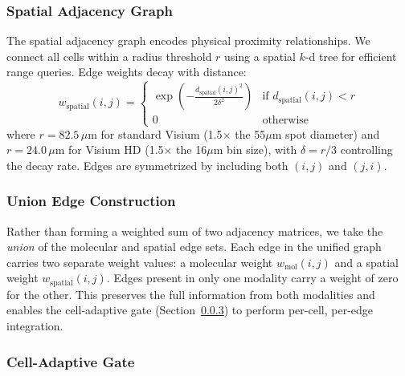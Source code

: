 \documentclass{article}
\begin{document}
\subsubsection{Spatial Adjacency Graph}

The spatial adjacency graph encodes physical proximity relationships. We connect all cells within a radius threshold $r$ using a spatial $k$-d tree for efficient range queries. Edge weights decay with distance:
\begin{equation}
w_{\text{spatial}}(i,j) = \begin{cases}
\exp\left(-\frac{d_{\text{spatial}}(i,j)^2}{2\delta^2}\right) & \text{if } d_{\text{spatial}}(i,j) < r \\
0 & \text{otherwise}
\end{cases}
\end{equation}
where $r = 82.5\,\mu$m for standard Visium (1.5$\times$ the 55$\mu$m spot diameter) and $r = 24.0\,\mu$m for Visium HD (1.5$\times$ the 16$\mu$m bin size), with $\delta = r/3$ controlling the decay rate. Edges are symmetrized by including both $(i,j)$ and $(j,i)$.

\subsubsection{Union Edge Construction}

Rather than forming a weighted sum of two adjacency matrices, we take the \emph{union} of the molecular and spatial edge sets. Each edge in the unified graph carries two separate weight values: a molecular weight $w_{\text{mol}}(i,j)$ and a spatial weight $w_{\text{spatial}}(i,j)$. Edges present in only one modality carry a weight of zero for the other. This preserves the full information from both modalities and enables the cell-adaptive gate (Section~\ref{sec:gate}) to perform per-cell, per-edge integration.

\subsubsection{Cell-Adaptive Gate}
\label{sec:gate}
\end{document}

